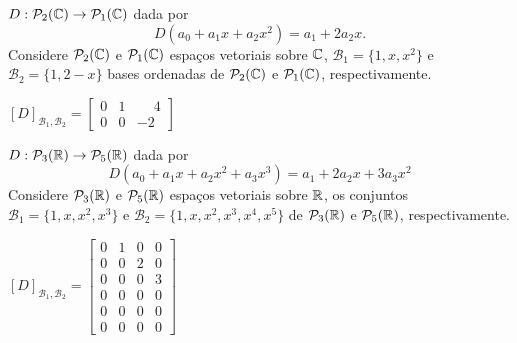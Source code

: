 \documentclass[12pt]{exam}
\begin{document}
\begin{exercicio}
    $D : \mathcal{P}_2(\mathbb{C}) \to \mathcal{P}_1(\mathbb{C})$ dada por
    \[
        D(a_0 + a_1x + a_2x^2) = a_1 + 2a_2x.
    \]
    Considere $\mathcal{P}_2(\mathbb{C})$ e $\mathcal{P}_1(\mathbb{C})$ espaços vetoriais sobre $\mathbb{C}$, $\mathcal{B}_1 = \{1, x, x^2\}$ e $\mathcal{B}_2 = \{1, 2 - x\}$ bases ordenadas de $\mathcal{P}_2(\mathbb{C})$ e $\mathcal{P}_1(\mathbb{C})$, respectivamente.

    \begin{solucao}
        $[D]_{\mathcal{B}_1, \mathcal{B}_2} = \begin{bmatrix}
            0 & 1 & \phantom{-}4\\
            0 & 0 & -2
        \end{bmatrix}$
    \end{solucao}
\end{exercicio}

\begin{exercicio}
    $D : \mathcal{P}_3(\mathbb{R}) \to \mathcal{P}_5(\mathbb{R})$ dada por
    \[
    D(a_0 + a_1x + a_2x^2 + a_3x^3) = a_1 + 2a_2x + 3a_3x^2
    \]
    Considere $\mathcal{P}_3(\mathbb{R})$ e $\mathcal{P}_5(\mathbb{R})$ espaços vetoriais sobre $\mathbb{R}$, os conjuntos $\mathcal{B}_1 = \{1, x, x^2, x^3\}$ e $\mathcal{B}_2 = \{1, x, x^2, x^3, x^4, x^5\}$ de $\mathcal{P}_3(\mathbb{R})$ e $\mathcal{P}_5(\mathbb{R})$, respectivamente.

    \begin{solucao}
        $[D]_{\mathcal{B}_1, \mathcal{B}_2} = \begin{bmatrix}
            0 & 1 & 0 & 0\\
            0 & 0 & 2 & 0\\
            0 & 0 & 0 & 3\\
            0 & 0 & 0 & 0\\
            0 & 0 & 0 & 0\\
            0 & 0 & 0 & 0
        \end{bmatrix}$
    \end{solucao}
\end{exercicio}
\end{document}
